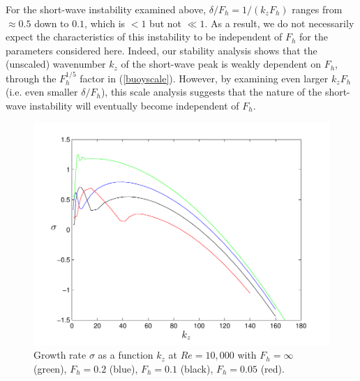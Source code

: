 For the short-wave instability examined above, $\delta/F_{h}=1/(k_{z}F_{h})$ ranges from $\approx 0.5$ down to $0.1$, which is $<1$ but not $\ll 1$. As a result, we do not necessarily expect the characteristics of this instability to be independent of $F_{h}$ for the parameters considered here. Indeed, our stability analysis shows that the (unscaled) wavenumber $k_{z}$ of the short-wave peak is weakly dependent on $F_{h}$, through the $F_{h}^{1/5}$ factor in (\ref{buoyscale}). However, by examining even larger $k_{z}F_{h}$ (i.e. even smaller $\delta/F_{h}$), this scale analysis suggests that the nature of the short-wave instability will eventually become independent of $F_{h}$.  

\begin{figure}
\begin{center}
\includegraphics[scale=0.7]{sigma_kz_scaling}
\caption{Growth rate $\sigma$ as a function $k_{z}$ at $Re=10{,}000$ with $F_{h}=\infty$ (green), $F_{h}=0.2$ (blue), $F_{h}=0.1$ (black), $F_{h}=0.05$ (red).}
\label{sigma_scaling}
\end{center}
\end{figure}


